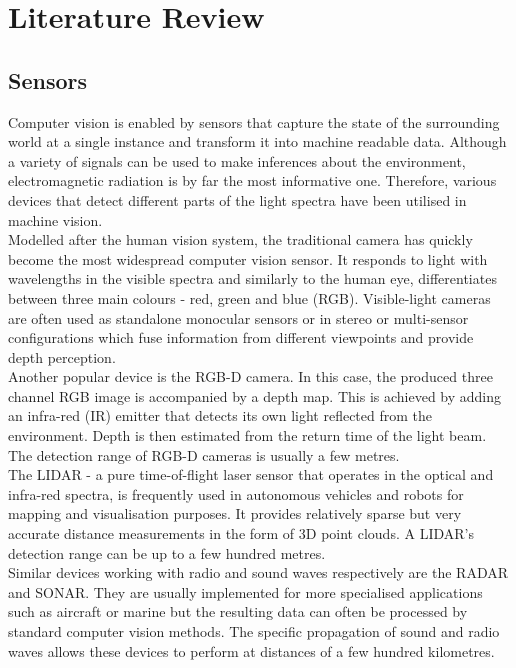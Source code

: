 \documentclass[main.tex]{subfiles}
\begin{document}
\section{Literature Review}
\subsection{Sensors}
Computer vision is enabled by sensors that capture the state of the surrounding world at a single instance and transform it into machine readable data. Although a variety of signals can be used to make inferences about the environment, electromagnetic radiation is by far the most informative one. Therefore, various devices that detect different parts of the light spectra have been utilised in machine vision. \\
\indent Modelled after the human vision system, the traditional camera has quickly become the most widespread computer vision sensor. It responds to light with wavelengths in the visible spectra and similarly to the human eye, differentiates between three main colours - red, green and blue (RGB). Visible-light cameras are often used as standalone monocular sensors or in stereo or multi-sensor configurations which fuse information from different viewpoints and provide depth perception.\\
\indent Another popular device is the RGB-D camera. In this case, the produced three channel RGB image is accompanied by a depth map. This is achieved by adding an infra-red (IR) emitter that detects its own light reflected from the environment. Depth is then estimated from the return time of the light beam. The detection range of RGB-D cameras is usually a few metres. \\
\indent The LIDAR - a pure time-of-flight laser sensor that operates in the optical and infra-red spectra, is frequently used in autonomous vehicles and robots for mapping and visualisation purposes. It provides relatively sparse but very accurate distance measurements in the form of 3D point clouds. A LIDAR's detection range can be up to a few hundred metres.\\
\indent Similar devices working with radio and sound waves respectively are the RADAR and SONAR. They are usually implemented for more specialised applications such as aircraft or marine but the resulting data can often be processed by standard computer vision methods. The specific propagation of sound and radio waves allows these devices to perform at distances of a few hundred kilometres. \\
\end{document}
